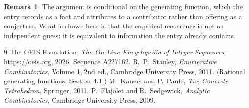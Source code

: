 \documentclass[11pt,a4paper]{article}
\theoremstyle{plain}
\theoremstyle{definition}
\newtheorem{remark}[theorem]{Remark}
\begin{document}
\begin{remark}
The argument is conditional on the generating function, which the entry records as a fact and
attributes to a contributor rather than offering as a conjecture. What is shown here is that
the empirical recurrence is not an independent guess: it is equivalent to information the
entry already contains.
\end{remark}

\begin{thebibliography}{9}
 The OEIS Foundation, \emph{The On-Line Encyclopedia of Integer
Sequences}, \url{https://oeis.org}, 2026. Sequence A227162.
 R.~P.~Stanley, \emph{Enumerative Combinatorics}, Volume 1, 2nd ed.,
Cambridge University Press, 2011. (Rational generating functions, Section 4.1.)
 M.~Kauers and P.~Paule, \emph{The Concrete Tetrahedron}, Springer, 2011.
 P.~Flajolet and R.~Sedgewick, \emph{Analytic Combinatorics}, Cambridge
University Press, 2009.
\end{thebibliography}
\end{document}
